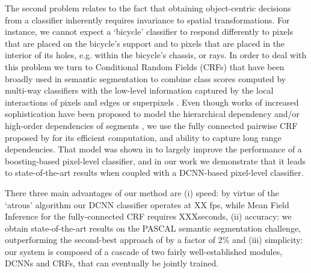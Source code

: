 The second problem relates to the fact that obtaining object-centric decisions from a classifier inherently requires invariance to spatial transformations. For instance, we cannot expect a `bicycle' classifier to respond differently to pixels that are  placed on the bicycle's support and to pixels that are placed in the interior of its holes, e.g. within the bicycle's chassis, or rays. In order to deal with this problem we turn to  Conditional Random Fields (CRFs) that have been broadly used in semantic segmentation to combine class scores computed by multi-way classifiers with the low-level information captured by the local interactions of   pixels and edges \citep{rother2004grabcut, shotton2009textonboost} or superpixels \citep{lucchi2011spatial}. Even though works of increased sophistication have been proposed 
 to model the hierarchical dependency \citep{he2004multiscale, ladicky2009associative, lempitsky2011pylon} and/or  high-order dependencies of segments \citep{delong2012fast, gonfaus2010harmony, kohli2009robust, krahenbuhl2011efficient}, we use the  fully connected pairwise CRF proposed by \citet{krahenbuhl2011efficient} for its efficient computation, and ability to capture  long range dependencies. That model was shown in  \citet{krahenbuhl2011efficient} to largely improve the performance of a boosting-based pixel-level classifier, and in our work we demonstrate that it leads to state-of-the-art results when coupled with a DCNN-based pixel-level classifier. 


There  three main advantages of our method are (i) speed: by virtue of the `atrous' algorithm our DCNN classifier operates at XX fps, while Mean Field Inference for the fully-connected CRF requires XXXseconds, (ii) accuracy: we obtain state-of-the-art results on the PASCAL semantic segmentation challenge, outperforming the second-best approach of \citet{mostajabi2014feedforward} by a factor of 2$\%$ and (iii) simplicity: our system is composed of a cascade of two fairly well-established modules, DCNNs and CRFs, that can eventually be jointly trained. 


